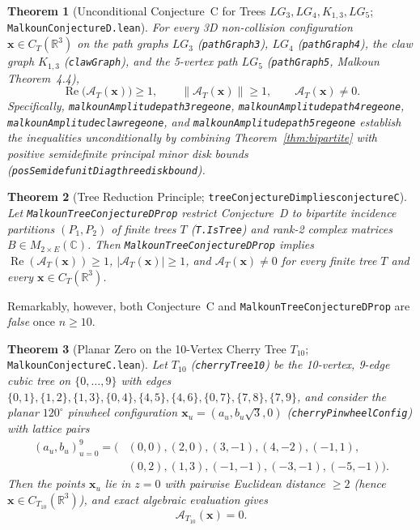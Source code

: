 \documentclass[11pt]{amsart}
\renewcommand{\_}{\origunderscore\penalty0\relax}
\theoremstyle{plain}
\newtheorem{theorem}{Theorem}[section]
\theoremstyle{definition}
\theoremstyle{remark}
\newcommand{\C}{\mathbb{C}}
\newcommand{\R}{\mathbb{R}}
\DeclareMathOperator{\RePart}{Re}
\begin{document}
\begin{theorem}[Unconditional Conjecture~C for Trees $LG_3, LG_4, K_{1,3}, LG_5$; \texttt{MalkounConjectureD.lean}]\label{thm:trees}
For every 3D non-collision configuration $\mathbf{x} \in C_T(\R^3)$ on the path graphs $LG_3$ (\texttt{pathGraph3}), $LG_4$ (\texttt{pathGraph4}), the claw graph $K_{1,3}$ (\texttt{clawGraph}), and the 5-vertex path $LG_5$ (\texttt{pathGraph5}, Malkoun Theorem~4.4),
\[
    \RePart\bigl(\mathcal{A}_T(\mathbf{x})\bigr) \ge 1, \qquad \bigl\|\mathcal{A}_T(\mathbf{x})\bigr\| \ge 1, \qquad \mathcal{A}_T(\mathbf{x}) \neq 0.
\]
Specifically, \texttt{malkounAmplitude\_path3\_re\_ge\_one}, \texttt{malkounAmplitude\_path4\_re\_ge\_one}, \texttt{malkounAmplitude\_claw\_re\_ge\_one}, and \texttt{malkounAmplitude\_path5\_re\_ge\_one} establish the inequalities unconditionally by combining Theorem~\ref{thm:bipartite} with positive semidefinite principal minor disk bounds (\texttt{posSemidef\_unitDiag\_three\_disk\_bound}).
\end{theorem}

\begin{theorem}[Tree Reduction Principle; \texttt{treeConjectureD\_implies\_conjecture\_C}]\label{thm:tree_frontier}
Let \texttt{MalkounTreeConjectureDProp} restrict Conjecture~D to bipartite incidence partitions $(P_1, P_2)$ of finite trees $T$ (\texttt{T.IsTree}) and rank-2 complex matrices $B \in M_{2 \times E}(\C)$. Then \texttt{MalkounTreeConjectureDProp} implies $\RePart(\mathcal{A}_T(\mathbf{x})) \ge 1$, $|\mathcal{A}_T(\mathbf{x})| \ge 1$, and $\mathcal{A}_T(\mathbf{x}) \neq 0$ for every finite tree $T$ and every $\mathbf{x} \in C_T(\R^3)$.
\end{theorem}

Remarkably, however, both Conjecture~C and \texttt{MalkounTreeConjectureDProp} are \emph{false} once $n \ge 10$.

\begin{theorem}[Planar Zero on the 10-Vertex Cherry Tree $T_{10}$; \texttt{MalkounConjectureC.lean}]\label{thm:cherry10}
Let $T_{10}$ (\texttt{cherryTree10}) be the 10-vertex, 9-edge cubic tree on $\{0,\dots,9\}$ with edges $\{0,1\},\allowbreak \{1,2\},\allowbreak \{1,3\},\allowbreak \{0,4\},\allowbreak \{4,5\},\allowbreak \{4,6\},\allowbreak \{0,7\},\allowbreak \{7,8\},\allowbreak \{7,9\}$, and consider the planar $120^\circ$ pinwheel configuration $\mathbf{x}_u = (a_u, b_u\sqrt{3}, 0)$ (\texttt{cherryPinwheelConfig}) with lattice pairs
\begin{align*}
    (a_u, b_u)_{u=0}^9 = \bigl(&(0,0),(2,0),(3,-1),(4,-2),(-1,1),\\
    &(0,2),(1,3),(-1,-1),(-3,-1),(-5,-1)\bigr).
\end{align*}
Then the points $\mathbf{x}_u$ lie in $z = 0$ with pairwise Euclidean distance $\ge 2$ (hence $\mathbf{x} \in C_{T_{10}}(\R^3)$), and exact algebraic evaluation gives
\[
    \mathcal{A}_{T_{10}}(\mathbf{x}) = 0.
\]
\end{theorem}
\end{document}
